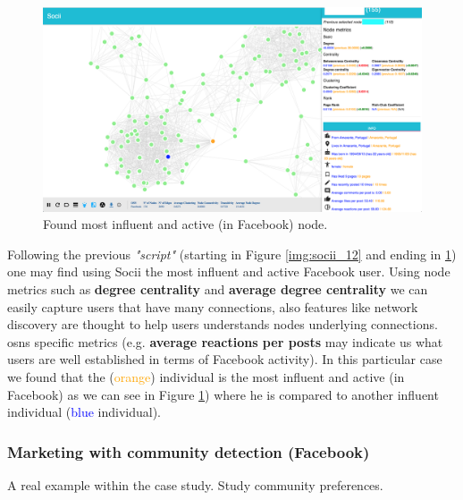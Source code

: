 \begin{figure}[h!]
\begin{center}
  \hspace*{-0.8in}
  \includegraphics[width=1.2\textwidth]{img/socii/socii_13.png}
\end{center}
\caption{\label{img:socii_13} Found most influent and active (in Facebook) node.}
\end{figure}

\indent Following the previous \textit{"script"} (starting in Figure \ref{img:socii_12} and ending in \ref{img:socii_13}) one may find using Socii the most influent and active Facebook user. Using node metrics such as \textbf{degree centrality} and \textbf{average degree centrality} we can easily capture users that have many connections, also features like network discovery are thought to help users understands nodes underlying connections. \glspl{osn} specific metrics (e.g. \textbf{average reactions per posts} may indicate us what users are well established in terms of Facebook activity). In this particular case we found that the (\textcolor{orange}{orange}) individual is the most influent and active (in Facebook) as we can see in Figure \ref{img:socii_13}) where he is compared to another influent individual (\textcolor{blue}{blue} individual).

\clearpage

\subsubsection{Marketing with community detection (Facebook)}
A real example within the case study. Study community preferences.

